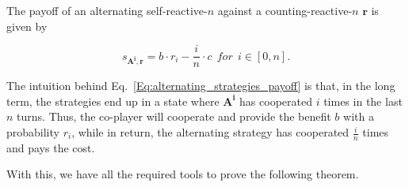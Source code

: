 \documentclass[11pt]{article}
\theoremstyle{plainCl1}
\theoremstyle{plainCl2}
\begin{document}
The payoff of an alternating self-reactive-$n$ against a counting-reactive-$n$ $\mathbf{r}$ is given by

\begin{equation}\label{Eq:alternating_strategies_payoff}
  s_{\mathbf{A^{i}}, \mathbf{r}} = b \cdot r_i - \frac{i}{n} \cdot c ~~for~~ i \in [0, n].
\end{equation}

The intuition behind Eq.~\eqref{Eq:alternating_strategies_payoff} is that, in
the long term, the strategies end up in a state where $\mathbf{A^{i}}$ has
cooperated $i$ times in the last $n$ turns. Thus, the co-player will cooperate
and provide the benefit $b$ with a probability $r_i$, while in return, the
alternating strategy has cooperated $\frac{i}{n}$ times and pays the cost.

With this, we have all the required tools to prove the following theorem.
\end{document}
